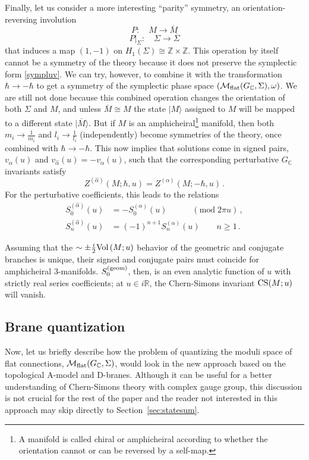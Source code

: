 \documentclass[hyper]{JHEP3}
\newcommand{\C}{{\mathbb{C}}}
\newcommand{\R}{{\mathbb{R}}}
\newcommand{\Z}{{\mathbb{Z}}}
\newcommand{\M}{{{\cal M}}_{{\rm flat}}}
\newcommand\be{\begin{equation}}
\newcommand\ee{\end{equation}}
\newcommand{\Vol}{{\mbox{Vol\,}}}
\begin{document}
Finally, let us consider a more interesting ``parity'' symmetry, an orientation-reversing involution
\be
P : \quad M \to \overline{M}
\ee
\be
P \vert_{\Sigma} : \quad \Sigma \to \overline{\Sigma}
\ee
that induces a map $(1,-1)$ on $H_1 (\Sigma) \cong \Z \times \Z$.
This operation by itself cannot be a symmetry of the theory because
it does not preserve the symplectic form \eqref{sympluv}.
We can try, however, to combine it with the transformation $\hbar \to - \hbar$
to get a symmetry of the symplectic phase space $(\M (G_{\C}, \Sigma), \omega)$.
We are still not done because this combined operation
changes the orientation of both $\Sigma$ and $M$,
and unless $\overline{M} \cong M$
the state $\vert M \rangle$ assigned to $M$ will be mapped
to a different state $\vert \overline{M} \rangle$.
But if $M$ is an amphicheiral\footnote{A manifold is called chiral or amphicheiral
according to whether the orientation cannot or can be reversed by a self-map.}
manifold, then both $m_i \to \frac{1}{m_i}$ and $l_i \to \frac{1}{l_i}$
(independently) become symmetries of the theory,
once combined with $\hbar \to - \hbar$.
This now implies that solutions come in signed pairs,
$v_{\alpha} (u)$ and $v_{\hat{\alpha}} (u) = -v_{\alpha} (u)$,
such that the corresponding perturbative $G_{\C}$ invariants satisfy
\be
Z^{(\hat{\alpha})} (M;\hbar,u) = Z^{(\alpha)} (M;-\hbar,u)\,.
\ee
For the perturbative coefficients, this leads to the relations
\begin{align}
S_0^{(\hat{\alpha})}(u) & = -S_0^{(\alpha)}(u) \qquad\quad (\mbox{mod}\;2\pi u)\,, \label{sym_sign} \\
S_n^{(\hat{\alpha})}(u) & = (-1)^{n+1} S_n^{(\alpha)}(u) \qquad n\ge 1\,.
\label{sym_signsn}
\end{align}

Assuming that the $\sim \pm\frac{i}{2} \Vol (M;u)$ behavior of the geometric
and conjugate branches is unique, their signed and conjugate pairs must coincide
for amphicheiral 3-manifolds.
$S_0^{(\rm geom)}$, then, is an even analytic function of $u$ with strictly real
series coefficients; at $u \in i \R$, the Chern-Simons invariant ${\rm CS} (M;u)$ will vanish.


\subsection{Brane quantization}

Now, let us briefly describe how the problem of quantizing
the moduli space of flat connections, $\M (G_{\C},\Sigma)$, would look
in the new approach \cite{gukov-2008} based on the topological A-model and D-branes.
Although it can be useful for a better understanding of Chern-Simons theory
with complex gauge group, this discussion is not crucial for the rest of the paper and
the reader not interested in this approach may skip directly to Section~\ref{sec:statesum}.
\end{document}
